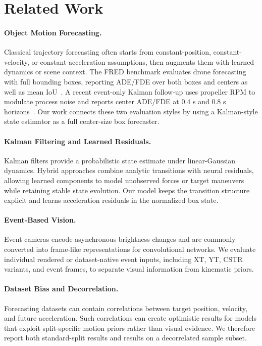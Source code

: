 \section{Related Work}

\paragraph{Object Motion Forecasting.}
Classical trajectory forecasting often starts from constant-position, constant-velocity, or constant-acceleration assumptions, then augments them with learned dynamics or scene context. The FRED benchmark evaluates drone forecasting with full bounding boxes, reporting ADE/FDE over both boxes and centers as well as mean IoU~\cite{magrini_fred_2025}. A recent event-only Kalman follow-up uses propeller RPM to modulate process noise and reports center ADE/FDE at $0.4$ s and $0.8$ s horizons~\cite{rpm_kalman_2026}. Our work connects these two evaluation styles by using a Kalman-style state estimator as a full center-size box forecaster.

\paragraph{Kalman Filtering and Learned Residuals.}
Kalman filters provide a probabilistic state estimate under linear-Gaussian dynamics. Hybrid approaches combine analytic transitions with neural residuals, allowing learned components to model unobserved forces or target maneuvers while retaining stable state evolution. Our model keeps the transition structure explicit and learns acceleration residuals in the normalized box state.

\paragraph{Event-Based Vision.}
Event cameras encode asynchronous brightness changes and are commonly converted into frame-like representations for convolutional networks. We evaluate individual rendered or dataset-native event inputs, including XT, YT, CSTR variants, and event frames, to separate visual information from kinematic priors.

\paragraph{Dataset Bias and Decorrelation.}
Forecasting datasets can contain correlations between target position, velocity, and future acceleration. Such correlations can create optimistic results for models that exploit split-specific motion priors rather than visual evidence. We therefore report both standard-split results and results on a decorrelated sample subset.

